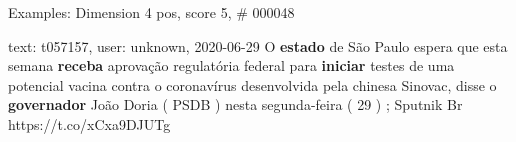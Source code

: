\begin{frame}{Examples: Dimension 4 pos, score 5, \# 000048}
\footnotesize
\begin{exampleblock}{text: t057157, user: unknown, 2020-06-29}
O \textbf{estado} de São Paulo espera que esta semana \textbf{receba} aprovação 
regulatória federal para \textbf{iniciar} testes de uma potencial vacina contra 
o coronavírus desenvolvida pela chinesa Sinovac, disse o \textbf{governador} 
João Doria ( PSDB ) nesta segunda-feira ( 29 ) ; Sputnik Br 
https://t.co/xCxa9DJUTg 
\end{exampleblock}
\end{frame}
